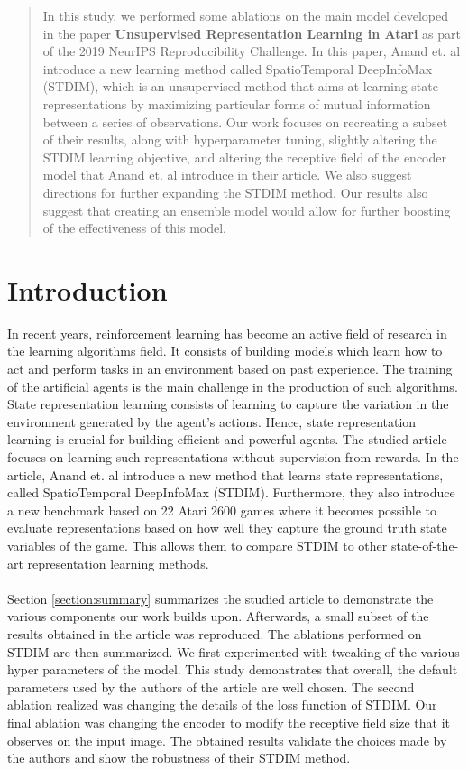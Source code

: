 \begin{abstract}
In this study, we performed some ablations on the main model developed in the paper \textbf{Unsupervised Representation Learning in Atari} \cite{main_article} as part of the 2019 NeurIPS Reproducibility Challenge. In this paper, Anand et. al introduce a new learning method called SpatioTemporal DeepInfoMax (STDIM), which is an unsupervised method that aims at learning state representations by maximizing particular forms of mutual information between a series of observations. Our work focuses on recreating a subset of their results, along with hyperparameter tuning, slightly altering the STDIM learning objective, and altering the receptive field of the encoder model that Anand et. al introduce in their article. We also suggest directions for further expanding the STDIM method. Our results also suggest that creating an ensemble model would allow for further boosting of the effectiveness of this model.
\end{abstract}

\section{Introduction}
In recent years, reinforcement learning has become an active field of research in the learning algorithms field. It consists of building models which learn how to act and perform tasks in an environment based on past experience. The training of the artificial agents is the main challenge in the production of such algorithms. State representation learning consists of learning to capture the variation in the environment generated by the agent's actions. Hence, state representation learning is crucial for building efficient and powerful agents. The studied article focuses on learning such representations without supervision from rewards. In the article, Anand et. al introduce a new method that learns state representations, called SpatioTemporal DeepInfoMax (STDIM). Furthermore, they also introduce a new benchmark based on 22 Atari 2600 games where it becomes possible to evaluate representations based on how well they capture the ground truth state variables of the game. This allows them to compare STDIM to other state-of-the-art representation learning methods.
\\\\
Section \ref{section:summary} summarizes the studied article to demonstrate the various components our work builds upon. Afterwards, a small subset of the results obtained in the article was reproduced. The ablations performed on STDIM are then summarized. We first experimented with tweaking of the various hyper parameters of the model. This study demonstrates that overall, the default parameters used by the authors of the article are well chosen. The second ablation realized was changing the details of the loss function of STDIM. Our final ablation was changing the encoder to modify the receptive field size that it observes on the input image. The obtained results validate the choices made by the authors and show the robustness of their STDIM method.

